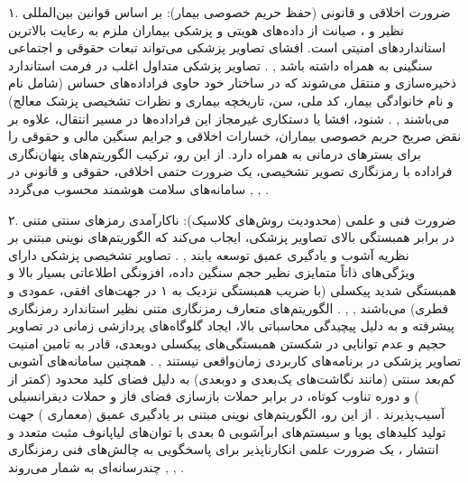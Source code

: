 ۱. ضرورت اخلاقی و قانونی (حفظ حریم خصوصی بیمار): بر اساس قوانین بین‌المللی نظیر  و ، صیانت از داده‌های هویتی و پزشکی بیماران ملزم به رعایت بالاترین استانداردهای امنیتی است. افشای تصاویر پزشکی می‌تواند تبعات حقوقی و اجتماعی سنگینی به همراه داشته باشد , . تصاویر پزشکی متداول اغلب در فرمت استاندارد  ذخیره‌سازی و منتقل می‌شوند که در ساختار خود حاوی فراداده‌های حساس  (شامل نام و نام خانوادگی بیمار، کد ملی، سن، تاریخچه بیماری و نظرات تشخیصی پزشک معالج) می‌باشند , . شنود، افشا یا دستکاری غیرمجاز این فراداده‌ها در مسیر انتقال، علاوه بر نقض صریح حریم خصوصی بیماران، خسارات اخلاقی و جرایم سنگین مالی و حقوقی را برای بسترهای درمانی به همراه دارد. از این رو، ترکیب الگوریتم‌های پنهان‌نگاری فراداده با رمزنگاری تصویر تشخیصی، یک ضرورت حتمی اخلاقی، حقوقی و قانونی در سامانه‌های سلامت هوشمند محسوب می‌گردد , , .\par



۲. ضرورت فنی و علمی (محدودیت روش‌های کلاسیک): ناکارآمدی رمزهای سنتی متنی در برابر همبستگی بالای تصاویر پزشکی، ایجاب می‌کند که الگوریتم‌های نوینی مبتنی بر نظریه آشوب و یادگیری عمیق توسعه یابند , . تصاویر تشخیصی پزشکی دارای ویژگی‌های ذاتاً متمایزی نظیر حجم سنگین داده، افزونگی اطلاعاتی بسیار بالا و همبستگی شدید پیکسلی (با ضریب همبستگی نزدیک به ۱ در جهت‌های افقی، عمودی و قطری) می‌باشند , , . الگوریتم‌های متعارف رمزنگاری متنی نظیر استاندارد رمزنگاری پیشرفته  و  به دلیل پیچیدگی محاسباتی بالا، ایجاد گلوگاه‌های پردازشی زمانی در تصاویر حجیم و عدم توانایی در شکستن همبستگی‌های پیکسلی دو‌بعدی، قادر به تامین امنیت تصاویر پزشکی در برنامه‌های کاربردی زمان‌واقعی نیستند , . همچنین سامانه‌های آشوبی کم‌بعد سنتی (مانند نگاشت‌های یک‌بعدی و دوبعدی) به دلیل فضای کلید محدود (کمتر از ) و دوره تناوب کوتاه، در برابر حملات بازسازی فضای فاز و حملات دیفرانسیلی آسیب‌پذیرند . از این رو، الگوریتم‌های نوینی مبتنی بر یادگیری عمیق (معماری ) جهت تولید کلیدهای پویا و سیستم‌های ابرآشوبی ۵ بعدی با توان‌های لیاپانوف مثبت متعدد و انتشار ، یک ضرورت علمی انکارناپذیر برای پاسخگویی به چالش‌های فنی رمزنگاری چندرسانه‌ای به شمار می‌روند , , .\par

